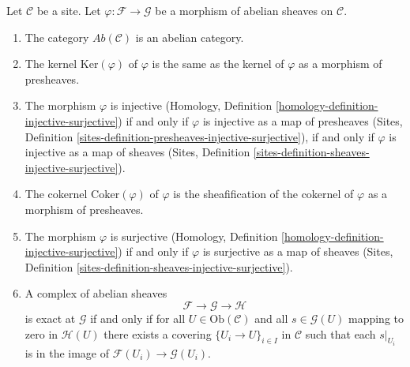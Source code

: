 \begin{lemma}
\label{lemma-abelian-abelian}
Let $\mathcal{C}$ be a site. Let $\varphi : \mathcal{F} \to \mathcal{G}$
be a morphism of abelian sheaves on $\mathcal{C}$.
\begin{enumerate}
\item The category $\textit{Ab}(\mathcal{C})$ is an abelian category.
\item The kernel $\text{Ker}(\varphi)$ of $\varphi$ is the same as the
kernel of $\varphi$ as a morphism of presheaves.
\item The morphism $\varphi$ is injective
(Homology, Definition \ref{homology-definition-injective-surjective})
if and only if $\varphi$ is injective as a map of presheaves
(Sites, Definition \ref{sites-definition-presheaves-injective-surjective}),
if and only if $\varphi$ is injective as a map of sheaves
(Sites, Definition \ref{sites-definition-sheaves-injective-surjective}).
\item The cokernel $\text{Coker}(\varphi)$ of $\varphi$ is the sheafification
of the cokernel of $\varphi$ as a morphism of presheaves.
\item The morphism $\varphi$ is surjective
(Homology, Definition \ref{homology-definition-injective-surjective})
if and only if $\varphi$ is surjective as a map of sheaves
(Sites, Definition \ref{sites-definition-sheaves-injective-surjective}).
\item A complex of abelian sheaves
$$
\mathcal{F} \to \mathcal{G} \to \mathcal{H}
$$
is exact at $\mathcal{G}$ if and only if for all
$U \in \text{Ob}(\mathcal{C})$ and all $s \in \mathcal{G}(U)$
mapping to zero in $\mathcal{H}(U)$ there exists a covering
$\{U_i \to U\}_{i \in I}$ in $\mathcal{C}$ such that each
$s|_{U_i}$ is in the image of $\mathcal{F}(U_i) \to \mathcal{G}(U_i)$.
\end{enumerate}
\end{lemma}

